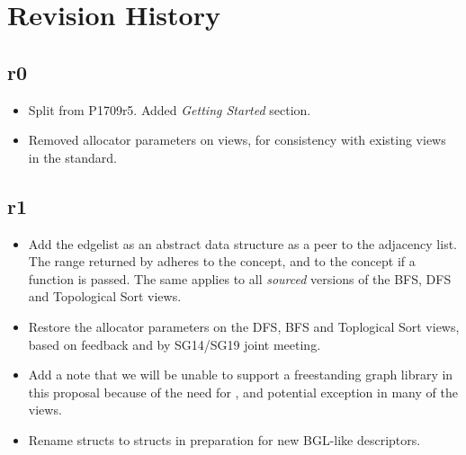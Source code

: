 \section{Revision History}

\subsection*{\paperno r0}

\begin{itemize}
      \item Split from P1709r5. Added \textit{Getting Started} section.
      \item Removed allocator parameters on views, for consistency with existing views in the standard. 
\end{itemize}

\subsection*{\paperno r1}
\begin{itemize}
      \item Add the edgelist as an abstract data structure as a peer to the adjacency list. 
            The range returned by  adheres to the  concept,
            and to the  concept if a  function is passed. The same applies to
            all \textit{sourced} versions of the BFS, DFS and Topological Sort views.
      \item Restore the allocator parameters on the DFS, BFS and Toplogical Sort views, based on feedback and 
            by SG14/SG19 joint meeting.
      \item Add a note that we will be unable to support a freestanding graph library in this proposal because
            of the need for ,  and potential  exception in many of 
            the views.
      \item Rename  structs to  structs in preparation for new BGL-like descriptors.
\end{itemize}

